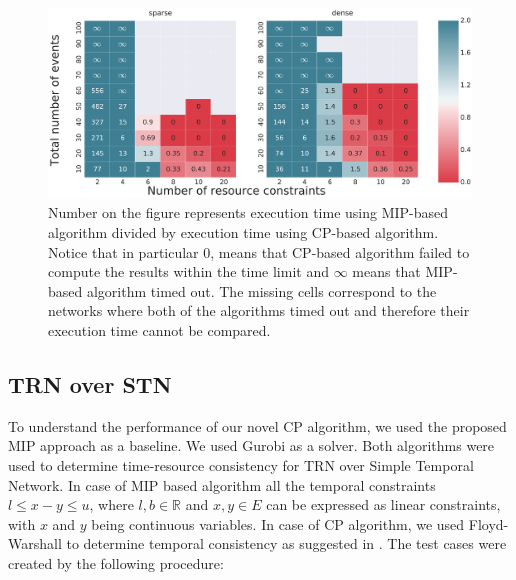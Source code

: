 \begin{figure}
\begin{center}
\includegraphics[width=\textwidth]{when_better}
\caption{Number on the figure represents execution time using MIP-based algorithm divided by execution time using CP-based algorithm. Notice that in particular $0$, means that CP-based algorithm failed to compute the results within the time limit and $\infty$ means that MIP-based algorithm timed out. The missing cells correspond to the networks where both of the algorithms timed out and therefore their execution time cannot be compared.   }
\label{fig:when_better}
\end{center}
\end{figure}

\subsection{TRN over STN}
To understand the performance of our novel CP algorithm, we used the proposed MIP approach as a baseline. We used Gurobi as a solver. Both algorithms were used to determine time-resource consistency for TRN over Simple Temporal Network. In case of MIP based algorithm all the temporal constraints $l \leq x - y \leq u$, where $l,b \in \mathbb{R}$ and $x,y \in E$ can be expressed as linear constraints, with $x$ and $y$ being continuous variables. In case of CP algorithm, we used Floyd-Warshall to determine temporal consistency as suggested in \cite{dechter1991temporal}. The test cases were created by the following procedure:


